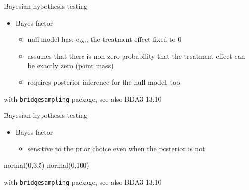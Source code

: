 \documentclass[english,t]{beamer}
\begin{document}
\begin{frame}{Bayesian hypothesis testing}

  \begin{itemize}
  \item Bayes factor
    \begin{itemize}
    \item null model has, e.g., the treatment effect fixed to 0
    \item assumes that there is non-zero probability that the
      treatment effect can be exactly zero (point mass)
    \item requires posterior inference for the null model, too
    \end{itemize}
  \end{itemize}
    \vspace{-1\baselineskip}
  
    \vspace{-1.2\baselineskip}
    
    {\footnotesize\color{gray}\hspace{1cm}  with {\tt bridgesampling} package, see also BDA3 13.10}
\end{frame}

\begin{frame}{Bayesian hypothesis testing}

  \begin{itemize}
  \item Bayes factor
    \begin{itemize}
    \item sensitive to the prior choice even when the posterior is not
    \end{itemize}
  \end{itemize}
  normal(0,3.5) \hspace{4.5cm} normal(0,100)
  \begin{minipage}{14.1cm}
    \end{minipage}
      \vspace{-1.2\baselineskip}
    {\footnotesize\color{gray}\hspace{1cm}  with {\tt bridgesampling} package, see also BDA3 13.10}
\end{frame}
\end{document}
